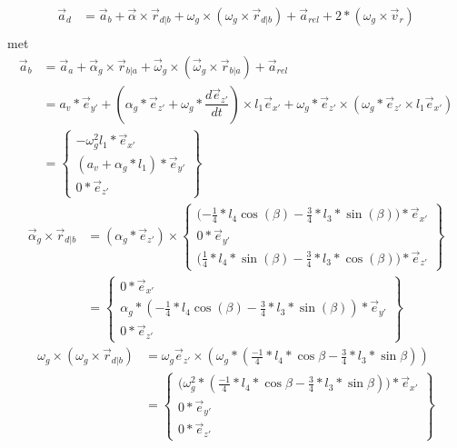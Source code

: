 \documentclass[a4paper,10pt]{article}
\begin{document}
\begin{equation}
	\begin{aligned}
		\vec{a}_d &= \vec{a}_b + \vec{\alpha} \times  \vec{r}_{d|b} + \omega_g \times (\omega_g \times \vec{r}_{d|b}) + \vec{a}_{rel} + 2* (\omega_g \times \vec{v}_r)\\
	\end{aligned}
\end{equation}
met\\
\begin{equation}
\begin{aligned}
\vec{a}_b &= \vec{a}_a + \vec{\alpha}_g  \times \vec{r}_{b|a} + \vec{\omega}_g \times (\vec{\omega}_g \times \vec{r}_{b|a}) + \vec{a}_{rel}\\
&= a_v * \vec{e}_{y'} + (\alpha_g * \vec{e}_{z'} + \omega_g *\dfrac{d\vec{e}_{z'}}{dt}) \times l_1 \vec{e}_{x'} + \omega_{g} *\vec{e}_{z'} \times (\omega_{g} *\vec{e}_{z'}  \times l_1 \vec{e}_{x'})\\
& = \begin{Bmatrix}
-\omega^{2}_g l_1 * \vec{e}_{x'}\\
(a_v + \alpha_g * l_1)*\vec{e}_{y'}\\
0 * \vec{e}_{z'}
\end{Bmatrix}
\end{aligned}
\end{equation}
\begin{equation}
\begin{aligned}
	\vec{\alpha}_g \times \vec{r}_{d|b}  &= (\alpha_g * \vec{e}_{z'}) \times \begin{Bmatrix}
	\Big({-\frac{1}{4}} * l_4 \cos(\beta)-\frac{3}{4}*l_3*\sin(\beta)\Big)*\vec{e}_{x'}\\
	0 * \vec{e}_{y'}\\
	\Big (\frac{1}{4}*l_4 *\sin(\beta) - \frac{3}{4}*l_3*\cos(\beta)\Big) * \vec{e}_{z'}
	\end{Bmatrix}\\
	&= \begin{Bmatrix}
	0*\vec{e}_{x'}\\
	\alpha_g *({-\frac{1}{4}} * l_4 \cos(\beta)-\frac{3}{4}*l_3*\sin(\beta))*\vec{e}_{y'}\\
	0*\vec{e}_{z'}
	\end{Bmatrix}
\end{aligned}
\end{equation}
\begin{equation}
	\begin{aligned}
	\omega_g \times (\omega_g \times \vec{r}_{d|b}) &= \omega_g \vec{e}_{z'} \times (\omega_g*(\frac{-1}{4}*l_4*\cos{\beta}-\frac{3}{4}*l_3*\sin{\beta}))\\
	& = \begin{Bmatrix}
	\Big(\omega_{g}^{2} * (\frac{-1}{4}*l_4*\cos{\beta}-\frac{3}{4}*l_3*\sin{\beta})\Big) * \vec{e}_{x'}\\
	0*\vec{e}_{y'}\\
	0*\vec{e}_{z'}
	\end{Bmatrix}
	\end{aligned}
\end{equation}\\
\end{document}
